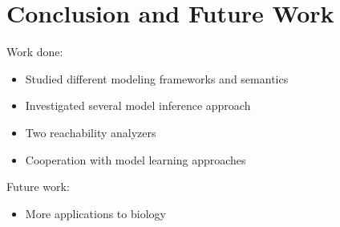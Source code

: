 \chapter{Conclusion and Future Work}
Work done:
\begin{itemize}
    \item Studied different modeling frameworks and semantics
    \item Investigated several model inference approach
    \item Two reachability analyzers
    \item Cooperation with model learning approaches
\end{itemize}

Future work:
\begin{itemize}
    \item More applications to biology
\end{itemize}